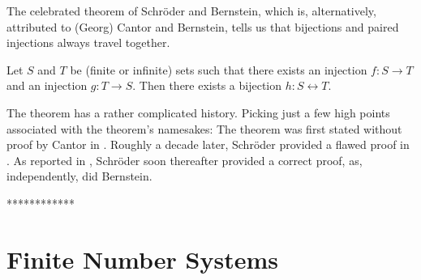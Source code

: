\noindent
The celebrated theorem of Schr\"{o}der and Bernstein,
which is, alternatively, attributed to (Georg) Cantor and Bernstein, 
tells us that bijections and paired injections always travel together.

\begin{theorem}
\label{thm.S-B}
Let $S$ and $T$ be (finite or infinite) sets such that there exists an
injection $f: S \rightarrow T$ and an injection $g: T \rightarrow S$.
Then there exists a bijection $h: S \leftrightarrow T$.
\end{theorem}

The theorem has a rather complicated history.  Picking just a few high
points associated with the theorem's namesakes: The theorem was first
stated without proof by Cantor in \cite{Cantor87}.  Roughly a decade
later, Schr\"{o}der provided a flawed proof in \cite{Schroeder98a}.
As reported in \cite{Deiser2010}, Schr\"{o}der soon thereafter
provided a correct proof, as, independently, did Bernstein.

************


\section{Finite Number Systems}
\label{sec:congruences+modular}

